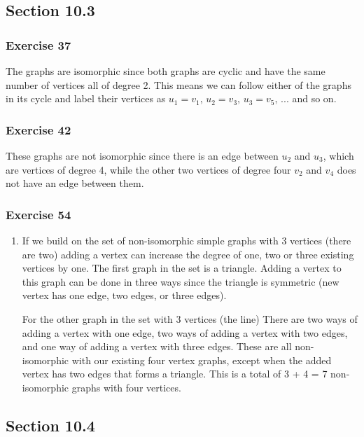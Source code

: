\documentclass[a4paper]{article}
\newcommand{\ex}[1]{\subsubsection*{#1}}
\begin{document}
\pagestyle{fancy} %



\subsection*{Section 10.3}
\ex{Exercise 37}

The graphs are isomorphic since both graphs are cyclic and have the same number
    of vertices all of degree 2. This means we can follow either of the graphs
    in its cycle and label their vertices as \(u_1 = v_1,\, u_2 = v_3,\, u_3 = v_5,\,
    ...\) and so on.

\ex{Exercise 42}

These graphs are not isomorphic since there is an edge between \(u_2\) and
    \(u_3\), which are vertices of degree 4, while the other two vertices of
    degree four \(v_2\) and \(v_4\) does not have an edge between them. 

\ex{Exercise 54} 

\begin{enumerate}[label=\alph*), start=3] %
    \item If we build on the set of non-isomorphic simple graphs with 3
        vertices (there are two) adding a vertex can increase the degree of
        one, two or three existing vertices by one. The first graph in the set
        is a triangle. Adding a vertex to this graph can be done in three ways
        since the triangle is symmetric (new vertex has one edge, two edges, or
        three edges). 
        
        For the other graph in the set with 3 vertices (the line)
        There are two ways of adding a vertex with one edge, two ways of adding
        a vertex with two edges, and one way of adding a vertex with three
        edges. These are all non-isomorphic with our existing four vertex
        graphs, except when the added vertex has two edges that forms a
        triangle. This is a total of 3 + 4 = 7 non-isomorphic graphs with four
        vertices. 

\end{enumerate}

\subsection*{Section 10.4}
\end{document}
